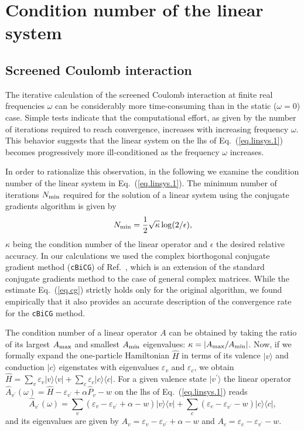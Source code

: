 \documentclass[twocolumn,prb,showpacs,superscriptaddress]{revtex4}
\def\w{\omega}
\def\>{\rangle}
\def\<{\langle}
\def\H{\hat{H}}
\def\E{\varepsilon}
\def\vp{{v^\prime}}
\begin{document}
\appendix

\section{Condition number of the linear system}\label{app.condition}

\subsection{Screened Coulomb interaction}

The iterative calculation of the screened Coulomb interaction at finite real
frequencies $\w$ can be considerably more time-consuming than in the static
($\w=0$) case. Simple tests indicate that the computational effort, as given
by the number of iterations required to reach convergence, increases with 
increasing frequency $\w$. This behavior suggests that the linear system 
on the lhs of Eq.\ (\ref{eq.linsys.1}) becomes progressively more ill-conditioned 
as the frequency $\w$ increases.

In order to rationalize this observation, in the following we examine
the condition number of the linear system in Eq.\ (\ref{eq.linsys.1}).
The minimum number of iterations $N_{\rm min}$ required for the solution of
a linear system using the conjugate gradients algorithm is given by
  \begin{equation}\label{eq.cg}
  N_{\rm min} = \frac{1}{2}\sqrt{\kappa} \log(2/\epsilon),
  \end{equation}
$\kappa$ being the condition number of the linear operator and $\epsilon$ the
desired relative accuracy.\cite{painless.cg} In our calculations we used the 
complex biorthogonal conjugate gradient method ({\tt cBiCG}) of Ref.\ ,
which is an extension of the standard conjugate gradients method to the 
case of general complex matrices. While the estimate Eq.\ (\ref{eq.cg}) strictly 
holds only for the original algorithm, we found empirically that it also 
provides an accurate description of the convergence rate for the {\tt cBiCG} 
method.

The condition number of a linear operator $A$ can be obtained by taking the ratio 
of its largest $A_{\rm max}$ and smallest $A_{\rm min}$ eigenvalues: 
$\kappa=|A_{\rm max}/A_{\rm min}|$.
Now, if we formally expand the one-particle Hamiltonian $\H$ in terms of its valence 
$|v\>$ and conduction $|c\>$ eigenstates with eigenvalues $\E_v$ and $\E_c$, we obtain
$\H = \sum_v \E_v |v\>\<v| + \sum_c \E_c |c\>\<c|$. For a given valence state 
$|v^\prime\>$ the linear operator $\hat{A}_\vp (\w) = \H - \E_\vp + \alpha \hat{P}_v - w$ 
on the lhs of Eq.\ (\ref{eq.linsys.1}) reads
  \begin{equation}
  \hat{A}_\vp (\w)  = 
  \sum_v ( \E_v - \E_\vp + \alpha - w ) |v\>\<v| 
  + \sum_c ( \E_c - \E_\vp - w ) |c\>\<c|,
  \end{equation}
and its eigenvalues are given by $A_v = \E_v - \E_\vp + \alpha - w$ and
$A_c = \E_c - \E_\vp - w$. 
\end{document}

